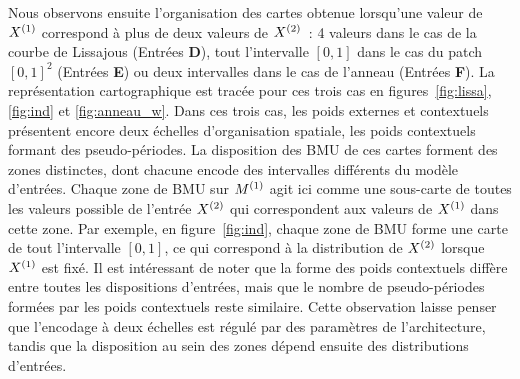 \documentclass[../main]{subfiles}
\begin{document}
Nous observons ensuite l'organisation des cartes obtenue lorsqu'une valeur de $X^{({1})}$ correspond à plus de deux valeurs de $X^{({2})}$~: 4 valeurs dans le cas de la courbe de Lissajous (Entrées \textbf{D}), tout l'intervalle $[0,1]$ dans le cas du patch $[0,1]^2$ (Entrées \textbf{E}) ou deux intervalles dans le cas de l'anneau (Entrées \textbf{F}).
La représentation cartographique est tracée pour ces trois cas en figures~\ref{fig:lissa}, \ref{fig:ind} et \ref{fig:anneau_w}.
Dans ces trois cas, les poids externes et contextuels présentent encore deux échelles d'organisation spatiale, les poids contextuels formant des pseudo-périodes.
La disposition des BMU de ces cartes forment des zones distinctes, dont chacune encode des intervalles différents du modèle d'entrées. 
Chaque zone de BMU sur $M^{({1})}$ agit ici comme une sous-carte de toutes les valeurs possible de l'entrée $X^{({2})}$ qui correspondent aux valeurs de $X^{({1})}$ dans cette zone.
Par exemple, en figure~\ref{fig:ind}, chaque zone de BMU forme une carte de tout l'intervalle $[0,1]$, ce qui correspond à la distribution de $X^{({2})}$ lorsque $X^{({1})}$ est fixé.
Il est intéressant de noter que la forme des poids contextuels diffère entre toutes les dispositions d'entrées, mais que le nombre de pseudo-périodes formées par les poids contextuels reste similaire. Cette observation laisse penser que l'encodage à deux échelles est régulé par des paramètres de l'architecture, tandis que la disposition au sein des zones dépend ensuite des distributions d'entrées.
\end{document}
